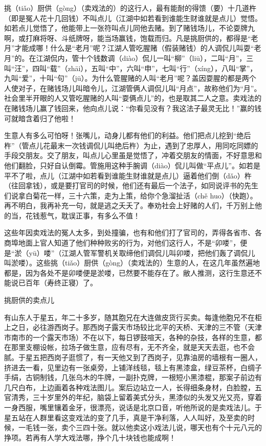 \documentclass[12pt,UTF8]{ctexbook}
\begin{document}
挑（tiǎo）厨供（gòng）（卖戏法的）的这行人，最有能耐的得馈（要）十几道杵（即是冤人花十几回钱）不叫点儿（江湖中如若看到谁能生财谁就是点儿）觉悟。如若点儿觉悟了，他能带上一张符叫点儿同他去赌。到了赌钱场儿，不论耍牌九啊，或打麻将呀、斗纸牌呀，能当场赢钱，饱载而归。凡是挑厨供的，都得是“老月”才能成哪！什么是“老月”呢？江湖人管吃腥赌（假装赌钱）的人调侃儿叫耍“老月”的。在江湖侃内，管十个钱数调（diào）侃儿一叫“柳”（liū），二叫“月”，三叫“汪”，四叫“载”（zhāi），五叫“中”，六叫“申”，七叫“行”（xíng），八叫“掌”，九叫“爱”，十叫“句”（jū）。为什么管腥赌的人叫“老月”呢？盖因耍腥的都是两个人使对子，在赌钱场儿叫暗令儿，江湖管俩人调侃儿叫“月点”，故称他们为“月”。社会里半开眼的人又管吃腥赌的人叫“耍俩点儿”的，也是取其二人之意。卖戏法的在赌钱场儿赢了钱回来，他向点儿说：“你看见没有？我这法子最灵无比！”赢的钱可就暗含着归了他啦！

生意人有多么可怕呀！张嘴儿，动身儿都有他们的利益。他们把点儿挖到“绝后杵”（管点儿花最末一次钱调侃儿叫绝后杵）为止，遇到了忠厚人，用同吃同嫖的手段交朋友。交了朋友，叫点儿心里虽是觉悟了，冲着交朋友的情面，不好意思和他们翻脸，只好自认倒霉。管施用这种手腕调（diào）侃儿叫做“平点儿”。如若是平不了啦，点儿（江湖中如若看到谁能生财谁就是点儿）逼着他们倒（dǎo）杵（往回拿钱），或是要打官司的时候，他们还有最后一个法子，如同说评书的先生们说拿白菊花一样，三十六策，走为上策，给你个急溜扯活（chě huo）（快跑）。再不明白，我再补充一句，就是逃之夭夭了。奉劝社会上好赌的人们，千万别上他的当，花钱惹气，耽误正事，有多么不值！

这些年因卖戏法的冤人太多，到处撞骗，也有和他们打了官司的，弄得各省市、各商埠地面上官人知道了他们种种败劣的行为，对他们这行人，不是“卯喽”，便是“淤（yū）喽”（江湖人管军警机关取缔他们调侃儿叫卯喽，把他们轰了调侃儿叫淤喽）。这些挑（tiǎo）厨供（gòng）（卖戏法的）生意的人，在这几年虽然遍地都是，因为各处不是卯喽便是淤喽，已然要不能存在了。敝人推测，这行生意还不能说已百年（寿终正寝）了。





挑厨供的卖点儿


有山东人于星五，年二十多岁，随其胞兄在大连做皮货行买卖。每逢他胞兄不在柜上之日，必往游西岗子。那西岗子露天市场较比北平的天桥、天津的三不管（天津市南市的一个露天市场）不在以下，每日锣鼓喧天，各种的杂技，各样的生意，都在那里支棚设帐，拉场子做生意，应有尽有，无不齐全，就是天天去逛，也不会腻。于星五把西岗子逛惯了，有一天他又到了西岗子，见靠油房的墙根有一圈人，挤进去一看，见里边有一张桌旁，上铺洋线毯，毯上有黑漆盒，绿豆茶杯，白绸子手绢，古铜制钱，几张乌木的牛牌，一副扑克牌，一根短小黑漆棍，那案子前边有几尺白布，上边画着各种戏法图儿。案后边站立一人，长得细条身材，白脸膛，五官清秀，三十岁里外的年纪，脑袋上留着美式分头，黑漆似的头发又光又亮，穿着一身西服，嘴里镶着金牙，很漂亮，说话是北京口音，听他所说的是卖戏法儿。于星五站在人群里看这变戏法的变了几手，真是干净利落，人人叫好，及至卖的时候，一毛钱一张，卖个三四十张。就以他卖这小戏法儿说，哪天也有个十元八元的挣项。若再有人学大戏法哪，挣个几十块钱也能成啊！
\end{document}
